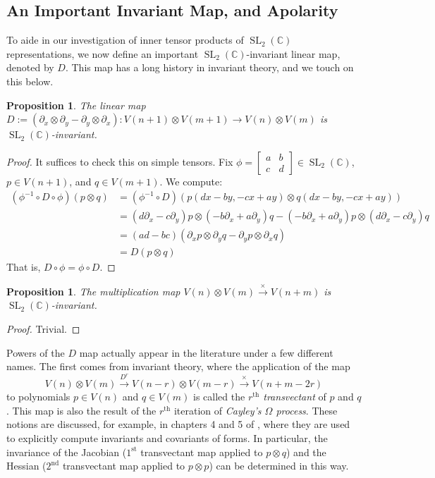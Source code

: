 \documentclass{article}
\newtheorem{proposition}[theorem]{Proposition}
\theoremstyle{definition}
\theoremstyle{plain}
\newcommand{\C}{\mathbb{C}}
\DeclareMathOperator{\SL}{SL}
\begin{document}
\subsection{An Important Invariant Map, and Apolarity}\label{inv_maps_subsect}

To aide in our investigation of inner tensor products of $\SL_2(\C)$ representations, we now define an important $\SL_2(\C)$-invariant linear map, denoted by $D$. This map has a long history in invariant theory, and we touch on this below.

\begin{proposition}\label{Dmap_prop}
    The linear map $D := (\partial_x \otimes \partial_y - \partial_y \otimes \partial_x): V(n+1) \otimes V(m+1) \rightarrow V(n) \otimes V(m)$ is $\SL_2(\C)$-invariant.
\end{proposition}
\begin{proof}
    It suffices to check this on simple tensors. Fix $\phi = \left[\begin{smallmatrix} a & b \\ c & d \end{smallmatrix}\right] \in \SL_2(\C)$, $p \in V(n+1)$, and $q \in V(m+1)$. We compute:
    \[
        \begin{split}
            (\phi^{-1} \circ D \circ \phi) (p \otimes q) &= (\phi^{-1} \circ D) (p(dx-by, -cx+ay) \otimes q(dx-by, -cx+ay)) \\
                &= (d\partial_x-c\partial_y)p \otimes (-b\partial_x+a\partial_y)q - (-b\partial_x+a\partial_y)p \otimes (d\partial_x-c\partial_y)q \\
                &= (ad-bc)(\partial_x p \otimes \partial_y q - \partial_y p \otimes \partial_x q) \\
                &= D (p \otimes q)
        \end{split}
    \]
    That is, $D \circ \phi = \phi \circ D$.
\end{proof}

\begin{proposition}
    The multiplication map $V(n) \otimes V(m) \xrightarrow{\times} V(n+m)$ is $\SL_2(\C)$-invariant.
\end{proposition}
\begin{proof}
    Trivial.
\end{proof}

Powers of the $D$ map actually appear in the literature under a few different names. The first comes from invariant theory, where the application of the map
\[
    V(n) \otimes V(m) \xrightarrow{D^r} V(n-r) \otimes V(m-r) \xrightarrow{\times} V(n+m-2r)
\]
to polynomials $p \in V(n)$ and $q \in V(m)$ is called the \emph{$r^\text{th}$ transvectant} of $p$ and $q$. This map is also the result of the $r^\text{th}$ iteration of \emph{Cayley's $\Omega$ process}. These notions are discussed, for example, in chapters 4 and 5 of \cite{olver1999invarianttheory}, where they are used to explicitly compute invariants and covariants of forms. In particular, the invariance of the Jacobian ($1^\text{st}$ transvectant map applied to $p \otimes q$) and the Hessian ($2^\text{nd}$ transvectant map applied to $p \otimes p$) can be determined in this way.
\end{document}
